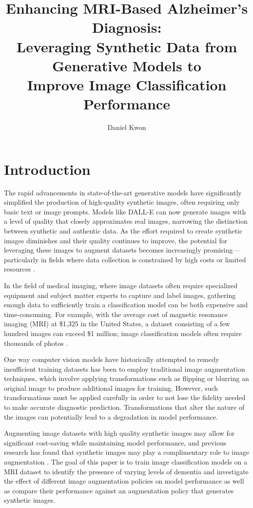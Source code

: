 \documentclass [MAS] {uclathes}
\title          {Enhancing MRI-Based Alzheimer's Diagnosis: \\
                 Leveraging Synthetic Data from Generative Models to \\
                 Improve Image Classification Performance}
\author         {Daniel Kwon}
\begin{document}
\makeintropages


\chapter{Introduction}
The rapid advancements in state-of-the-art generative models have significantly simplified the production of 
high-quality synthetic images, often requiring only basic text or image prompts. Models like DALL-E can now generate 
images with a level of quality that closely approximates real images, narrowing the distinction between synthetic and 
authentic data. As the effort required to create synthetic images diminishes and their quality continues to improve, the 
potential for leveraging these images to augment datasets becomes increasingly promising—particularly in fields where 
data collection is constrained by high costs or limited resources \cite{medical_imaging}.

In the field of medical imaging, where image datasets often require specialized equipment and subject matter experts to 
capture and label images, gathering enough data to sufficiently train a classification model can be both expensive and 
time-consuming. For example, with the average cost of magnetic resonance imaging (MRI) at \$1,325 in the United States, 
a dataset consisting of a few hundred images can exceed \$1 million; image classification models often require thousands
of photos \cite{mri_cost}. 

One way computer vision models have historically attempted to remedy insufficient training datasets has been to employ 
traditional image augmentation techniques, which involve applying transformations such as flipping or blurring an 
original image to produce additional images for training. However, such transformations must be applied carefully in 
order to not lose the fidelity needed to make accurate diagnostic prediction. Transformations that alter the nature of 
the images can potentially lead to a degradation in model performance.

Augmenting image datasets with high quality synthetic images may allow for significant cost-saving while maintaining 
model performance, and previous research has found that synthetic images may play a complimentary role to image 
augmentation \cite{synthetic_imaging}. The goal of this paper is to train image classification models on a MRI dataset 
to identify the presence of varying levels of dementia and investigate the effect of different image augmentation 
policies on model performance as well as compare their performance against an augmentation policy that generates 
synthetic images.
\end{document}

